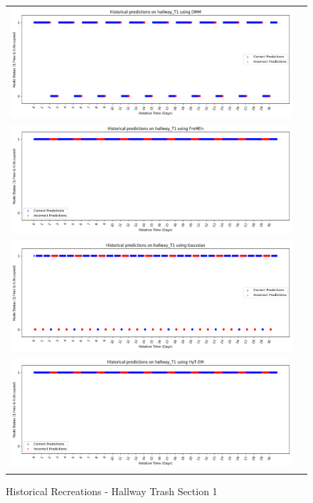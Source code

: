 \begin{center}
\begin{figure}[!Hp]
  \begin{tabular}{cc}
    {\includegraphics[width = 6in]{images/results/Historical_hallway_T1_DMM.png}} \\
    {\includegraphics[width = 6in]{images/results/Historical_hallway_T1_FreMEn.png}} \\
    {\includegraphics[width = 6in]{images/results/Historical_hallway_T1_Gaussian.png}} \\
    {\includegraphics[width = 6in]{images/results/Historical_hallway_T1_HyT-EM.png}} \\
  \end{tabular}
  \caption{Historical Recreations - Hallway Trash Section 1}
\end{figure}


\end{center}
